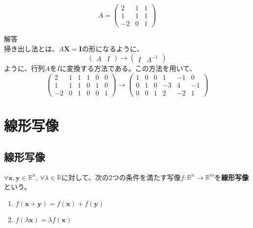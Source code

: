 \documentclass{jlreq}
\begin{document}
\begin{problem}
  \begin{equation*}
    A = \begin{pmatrix}
      2 & 1 & 1 \\
      1 & 1 & 1 \\
      -2 & 0 & 1
    \end{pmatrix}
  \end{equation*}
  \dotfill

  解答 \\
  掃き出し法とは、$A \boldsymbol{X} = \boldsymbol{I}$の形になるように、
  \begin{equation*}
    \begin{pmatrix}
      A & I
    \end{pmatrix} \to \begin{pmatrix}
      I & A^{-1}
    \end{pmatrix}
  \end{equation*}
  ように、行列$A$を$I$に変換する方法である。この方法を用いて、
  \begin{equation*}
    \begin{pmatrix}
      2 & 1 & 1 & 1 & 0 & 0 \\
      1 & 1 & 1 & 0 & 1 & 0 \\
      -2 & 0 & 1 & 0 & 0 & 1
    \end{pmatrix} \to \begin{pmatrix}
      1 & 0 & 0 & 1 & -1 & 0 \\
      0 & 1 & 0 & -3 & 4 & -1 \\
      0 & 0 & 1 & 2 & -2 & 1
    \end{pmatrix}
  \end{equation*}
\end{problem}

\section{線形写像}

\subsection{線形写像}
\begin{definitionbox}[線形写像]
  $\forall \boldsymbol{x}, \boldsymbol{y} \in \mathbb{R}^n$, $\forall \lambda \in \mathbb{R}$に対して、次の2つの条件を満たす写像$f: \mathbb{R}^n \to \mathbb{R}^m$を\textbf{線形写像}という。

  \begin{enumerate}
    \item $f(\boldsymbol{x} + \boldsymbol{y}) = f(\boldsymbol{x}) + f(\boldsymbol{y})$
    \item $f(\lambda \boldsymbol{x}) = \lambda f(\boldsymbol{x})$
  \end{enumerate}
\end{definitionbox}
\end{document}
